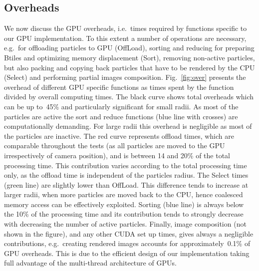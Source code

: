 \documentclass[preprint,5pt]{elsarticle}
\begin{document}
\subsection{Overheads}
\label{sec:overhead}
We now discuss the GPU overheads, i.e.\ times required by functions specific to our GPU implementation. To this extent a number of operations are necessary, e.g.\ for offloading particles to GPU (OffLoad), sorting and reducing for preparing Btiles and optimizing memory displacement (Sort), removing non-active particles, but also packing and copying back particles that have to be rendered by the CPU (Select) and performing partial images composition. Fig.~\ref{fig:over} presents the overhead of different GPU specific functions as times spent by the function divided by overall computing times. The black curve shows total overheads which can be up to~45\% and particularly significant for small radii. As most of the particles are active the sort and reduce
functions (blue line with crosses) are computationally demanding. For large radii this overhead is negligible as most of the particles are inactive. 
The red curve represents offload times, which are comparable throughout the tests (as all particles are moved to the GPU irrespectively of camera position), and is between 14 and 20\% of the total processing time. This contribution varies according to the total processing time only, as the offload time is independent of the particles radius.
The Select times (green line) are slightly lower than OffLoad. This difference tends to increase at larger radii,  when more particles are moved back to the CPU, hence coalesced memory access can be effectively exploited. 
Sorting (blue line) is always below the 10\% of the processing time and its contribution tends to strongly decrease with decreasing the 
number of active particles.
Finally, image composition (not shown in the figure), and any other CUDA set up times, gives always a negligible contributions, e.g.\ creating rendered images accounts for approximately~0.1\% of GPU overheads. This is due to the efficient design of our implementation taking full advantage of the multi-thread architecture of GPUs.
\end{document}
